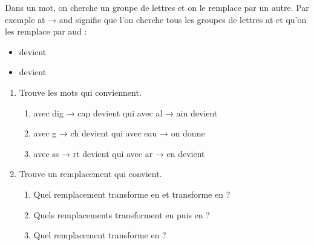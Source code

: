 \documentclass[class=report,crop=false, 12pt]{standalone}
\begin{document}
\begin{activite}

Dans un mot, on cherche un groupe de lettres et on le remplace par un autre. Par exemple \og at → aud \fg{} signifie que l'on cherche tous les groupes de lettres \og at \fg{} et qu'on les remplace par \og aud \fg{} :

\begin{itemize}
  \item {} devient 
  \item {} devient 
\end{itemize}

\begin{enumerate}
  \item Trouve les mots qui conviennent.
  \begin{enumerate}
    \item {} avec \og dig → cap \fg{} devient  qui avec \og al → ain \fg{} devient 
    \item {} avec \og g → ch \fg{} devient  qui avec \og eau → on \fg{} donne 
    \item {} avec \og ss → rt \fg{} devient  qui avec \og ar → en \fg{} devient 
  \end{enumerate}  

  \item Trouve un remplacement qui convient.
  \begin{enumerate}
    \item Quel remplacement transforme  en  et transforme  en  ?
    \item Quels remplacements transforment  en  puis en  ?
    \item Quel remplacement transforme  en  ?
  \end{enumerate}  
\end{enumerate}

\end{activite}
\end{document}
